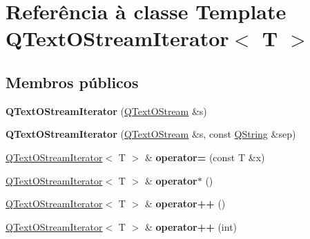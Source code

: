 \hypertarget{class_q_text_o_stream_iterator}{\section{Referência à classe Template Q\-Text\-O\-Stream\-Iterator$<$ T $>$}
\label{class_q_text_o_stream_iterator}
}
\subsection*{Membros públicos}
\begin{DoxyCompactItemize}
\item 
\hypertarget{class_q_text_o_stream_iterator_aeda6446b733e0fd6a0b5e66609f24d2d}{{\bfseries Q\-Text\-O\-Stream\-Iterator} (\hyperlink{class_q_text_o_stream}{Q\-Text\-O\-Stream} \&s)}\label{class_q_text_o_stream_iterator_aeda6446b733e0fd6a0b5e66609f24d2d}

\item 
\hypertarget{class_q_text_o_stream_iterator_a3d6ab60db8c869434a52642bbf3b8b09}{{\bfseries Q\-Text\-O\-Stream\-Iterator} (\hyperlink{class_q_text_o_stream}{Q\-Text\-O\-Stream} \&s, const \hyperlink{class_q_string}{Q\-String} \&sep)}\label{class_q_text_o_stream_iterator_a3d6ab60db8c869434a52642bbf3b8b09}

\item 
\hypertarget{class_q_text_o_stream_iterator_a225b9ad06d5fd0134a528b943a21e59c}{\hyperlink{class_q_text_o_stream_iterator}{Q\-Text\-O\-Stream\-Iterator}$<$ T $>$ \& {\bfseries operator=} (const T \&x)}\label{class_q_text_o_stream_iterator_a225b9ad06d5fd0134a528b943a21e59c}

\item 
\hypertarget{class_q_text_o_stream_iterator_a25cbbeda7620cb493173a3b022bb8d27}{\hyperlink{class_q_text_o_stream_iterator}{Q\-Text\-O\-Stream\-Iterator}$<$ T $>$ \& {\bfseries operator$\ast$} ()}\label{class_q_text_o_stream_iterator_a25cbbeda7620cb493173a3b022bb8d27}

\item 
\hypertarget{class_q_text_o_stream_iterator_a160e2f8e19a2e2f7b88398d64dcc2808}{\hyperlink{class_q_text_o_stream_iterator}{Q\-Text\-O\-Stream\-Iterator}$<$ T $>$ \& {\bfseries operator++} ()}\label{class_q_text_o_stream_iterator_a160e2f8e19a2e2f7b88398d64dcc2808}

\item 
\hypertarget{class_q_text_o_stream_iterator_addfbf8ec6f89f9e3d760774075573ab5}{\hyperlink{class_q_text_o_stream_iterator}{Q\-Text\-O\-Stream\-Iterator}$<$ T $>$ \& {\bfseries operator++} (int)}\label{class_q_text_o_stream_iterator_addfbf8ec6f89f9e3d760774075573ab5}

\end{DoxyCompactItemize}
